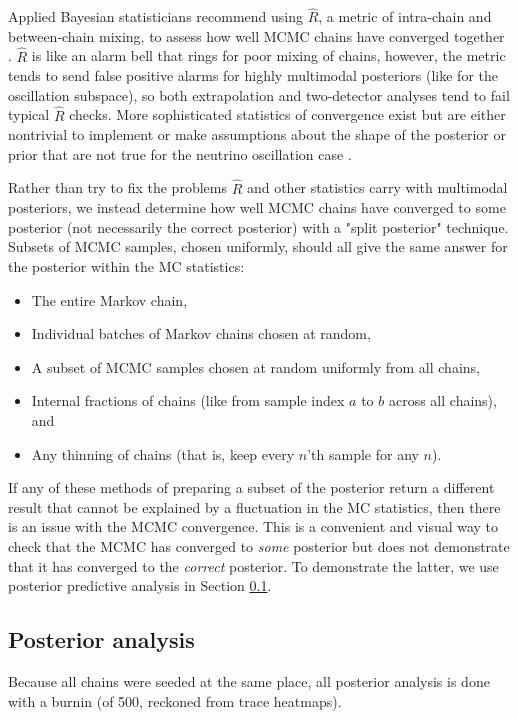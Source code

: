 \documentclass{article}
\begin{document}
Applied Bayesian statisticians recommend using $\widehat{R}$, a metric of intra-chain and between-chain mixing, to assess how well MCMC chains have converged together \cite{ref:stan_rhat}. $\widehat{R}$ is like an alarm bell that rings for poor mixing of chains, however, the metric tends to send false positive alarms for highly multimodal posteriors \cite{ref:nested_rhat} (like for the oscillation subspace), so both extrapolation and two-detector analyses tend to fail typical $\widehat{R}$ checks. More sophisticated statistics of convergence exist but are either nontrivial to implement or make assumptions about the shape of the posterior or prior that are not true for the neutrino oscillation case \cite{ref:rank_normalization}.

Rather than try to fix the problems $\widehat{R}$ and other statistics carry with multimodal posteriors, we instead determine how well MCMC chains have converged to some posterior (not necessarily the correct posterior) with a "split posterior" technique. Subsets of MCMC samples, chosen uniformly, should all give the same answer for the posterior within the MC statistics:
\begin{itemize}
  \item The entire Markov chain,
  \item Individual batches of Markov chains chosen at random,
  \item A subset of MCMC samples chosen at random uniformly from all chains,
  \item Internal fractions of chains (like from sample index $a$ to $b$ across all chains), and
  \item Any thinning of chains (that is, keep every $n$'th sample for any $n$).
\end{itemize}
If any of these methods of preparing a subset of the posterior return a different result that cannot be explained by a fluctuation in the MC statistics, then there is an issue with the MCMC convergence. This is a convenient and visual way to check that the MCMC has converged to \textit{some} posterior but does not demonstrate that it has converged to the \textit{correct} posterior. To demonstrate the latter, we use posterior predictive analysis in Section \ref{sec:posterior_analysis}.

\subsection{Posterior analysis}
\label{sec:posterior_analysis}
Because all chains were seeded at the same place, all posterior analysis is done with a burnin (of 500, reckoned from trace heatmaps).
\end{document}
